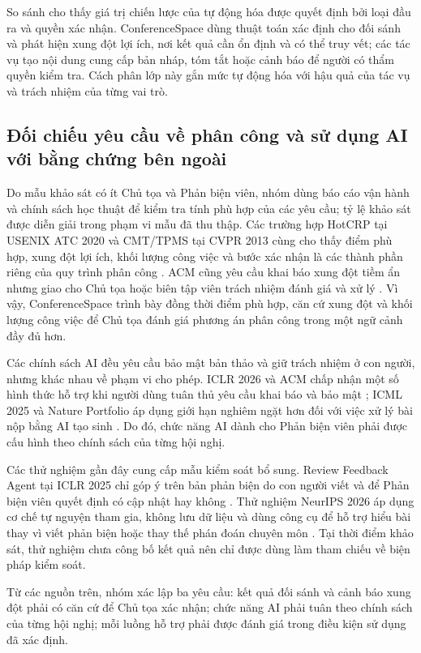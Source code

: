 So sánh cho thấy giá trị chiến lược của tự động hóa được quyết định bởi loại đầu ra và quyền xác nhận. ConferenceSpace dùng thuật toán xác định cho đối sánh và phát hiện xung đột lợi ích, nơi kết quả cần ổn định và có thể truy vết; các tác vụ tạo nội dung cung cấp bản nháp, tóm tắt hoặc cảnh báo để người có thẩm quyền kiểm tra. Cách phân lớp này gắn mức tự động hóa với hậu quả của tác vụ và trách nhiệm của từng vai trò.

\subsection{Đối chiếu yêu cầu về phân công và sử dụng AI với bằng chứng bên ngoài}

Do mẫu khảo sát có ít Chủ tọa và Phản biện viên, nhóm dùng báo cáo vận hành và chính sách học thuật để kiểm tra tính phù hợp của các yêu cầu; tỷ lệ khảo sát được diễn giải trong phạm vi mẫu đã thu thập. Các trường hợp HotCRP tại USENIX ATC 2020 và CMT/TPMS tại CVPR 2013 cùng cho thấy điểm phù hợp, xung đột lợi ích, khối lượng công việc và bước xác nhận là các thành phần riêng của quy trình phân công \cite{ch2ref58,ch2ref61}. ACM cũng yêu cầu khai báo xung đột tiềm ẩn nhưng giao cho Chủ tọa hoặc biên tập viên trách nhiệm đánh giá và xử lý \cite{ch2ref12}. Vì vậy, ConferenceSpace trình bày đồng thời điểm phù hợp, căn cứ xung đột và khối lượng công việc để Chủ tọa đánh giá phương án phân công trong một ngữ cảnh đầy đủ hơn.

Các chính sách AI đều yêu cầu bảo mật bản thảo và giữ trách nhiệm ở con người, nhưng khác nhau về phạm vi cho phép. ICLR 2026 và ACM chấp nhận một số hình thức hỗ trợ khi người dùng tuân thủ yêu cầu khai báo và bảo mật \cite{ch2ref15,ch2ref40}; ICML 2025 và Nature Portfolio áp dụng giới hạn nghiêm ngặt hơn đối với việc xử lý bài nộp bằng AI tạo sinh \cite{ch2ref16,ch2ref41}. Do đó, chức năng AI dành cho Phản biện viên phải được cấu hình theo chính sách của từng hội nghị.

Các thử nghiệm gần đây cung cấp mẫu kiểm soát bổ sung. Review Feedback Agent tại ICLR 2025 chỉ góp ý trên bản phản biện do con người viết và để Phản biện viên quyết định có cập nhật hay không \cite{ch2ref17,ch2ref18}. Thử nghiệm NeurIPS 2026 áp dụng cơ chế tự nguyện tham gia, không lưu dữ liệu và dùng công cụ để hỗ trợ hiểu bài thay vì viết phản biện hoặc thay thế phán đoán chuyên môn \cite{ch2ref19}. Tại thời điểm khảo sát, thử nghiệm chưa công bố kết quả nên chỉ được dùng làm tham chiếu về biện pháp kiểm soát.

Từ các nguồn trên, nhóm xác lập ba yêu cầu: kết quả đối sánh và cảnh báo xung đột phải có căn cứ để Chủ tọa xác nhận; chức năng AI phải tuân theo chính sách của từng hội nghị; mỗi luồng hỗ trợ phải được đánh giá trong điều kiện sử dụng đã xác định.

